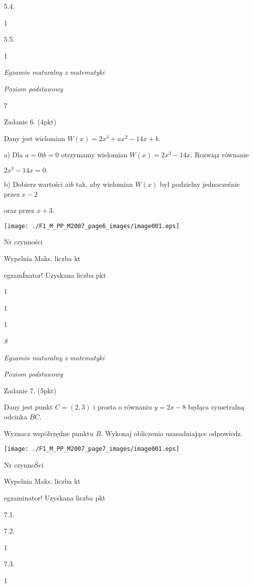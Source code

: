 \documentclass[a4paper,12pt]{article}
\begin{document}
5.4.

1

5.5.

1





{\it Egzamin maturalny z matematyki}

{\it Poziom podstawowy}

7

Zadanie 6. (4pkt)

Dany jest wielomian $W(x)=2x^{3}+ax^{2}-14x+b.$

a) Dla $a=0 \mathrm{i} b=0$ otrzymamy wielomian $W(x)=2x^{3}-14x$. Rozwiąz równanie

$2x^{3}-14x=0.$

b) Dobierz wartości $a\mathrm{i}b$ tak, aby wielomian $W(x)$ był podzielny jednocześnie przez $x-2$

oraz przez $x+3.$
\begin{center}
\texttt{[image: ./F1\_M\_PP\_M2007\_page6\_images/image001.eps]}
\end{center}
Nr czynności

Wypelnia Maks. liczba kt

egzamÍnator! Uzyskana liczba pkt

1

1

1





{\it 8}

{\it Egzamin maturalny z matematyki}

{\it Poziom podstawowy}

Zadanie 7. (5pkt)

Dany jest punkt $C=(2,3)$ i prosta o równaniu $y=2x-8$ będąca symetralną odcinka $BC.$

Wyznacz współrzędne punktu $B$. Wykonaj obliczenia uzasadniające odpowiedz.
\begin{center}
\texttt{[image: ./F1\_M\_PP\_M2007\_page7\_images/image001.eps]}
\end{center}
Nr czynnoŚci

Wypelnia Maks. liczba kt

egzaminator! Uzyskana liczba pkt

7.1.

7.2.

1

7.3.

1
\end{document}
